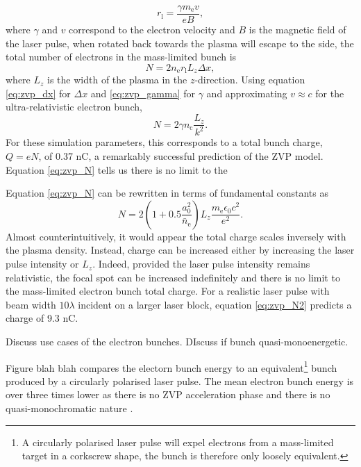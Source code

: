 \begin{equation}
	r_\mathrm{l} = \frac{\gamma m_\mathrm{e}v}{eB},
\end{equation}
where $\gamma$ and $v$ correspond to the electron velocity and $B$ is the magnetic field of the laser pulse, when rotated back towards the plasma will escape to the side, the total number of electrons in the mass-limited bunch is
\begin{equation}
	N = 2 n_\mathrm{e} r_\mathrm{l} L_z \Delta x,
\end{equation}
where $L_z$ is the width of the plasma in the $z$-direction. Using equation \ref{eq:zvp_dx} for $\Delta x$ and \ref{eq:zvp_gamma} for $\gamma$ and approximating $v \approx c$ for the ultra-relativistic electron bunch, 
\begin{equation}\label{eq:zvp_N}
	N = 2 \gamma n_\mathrm{c} \frac{L_z}{k^2}.
\end{equation}
For these simulation parameters, this corresponds to a total bunch charge, $Q = eN$, of 0.37 nC, a remarkably successful prediction of the ZVP model. Equation \ref{eq:zvp_N} tells us there is no limit to the 

Equation \ref{eq:zvp_N} can be rewritten in terms of fundamental constants as
\begin{equation}\label{eq:zvp_N2}
	N = 2 (1+0.5\frac{a^2_0}{\bar{n}_\mathrm{e}}) L_z \frac{m_\mathrm{e}\epsilon_0c^2}{e^2}.
\end{equation}
Almost counterintuitively, it would appear the total charge scales inversely with the plasma density. Instead, charge can be increased either by increasing the laser pulse intensity or $L_z$. Indeed, provided the laser pulse intensity remains relativistic, the focal spot can be increased indefinitely and there is no limit to the mass-limited electron bunch total charge. For a realistic laser pulse with beam width $10 \lambda$ incident on a larger laser block, equation \ref{eq:zvp_N2} predicts a charge of 9.3 nC.


Discuss use cases of the electron bunches.
DIscuss if  bunch quasi-monoenergetic.

Figure blah blah compares the electorn bunch energy to an equivalent\footnote{A circularly polarised laser pulse will expel electrons from a mass-limited target in a corkscrew shape, the bunch is therefore only loosely equivalent.} bunch produced by a circularly polarised laser pulse. The mean electron bunch energy is over three times lower as there is no ZVP acceleration phase and there is no quasi-monochromatic nature \cite{baevaZeroVectorPotential2011}. 

